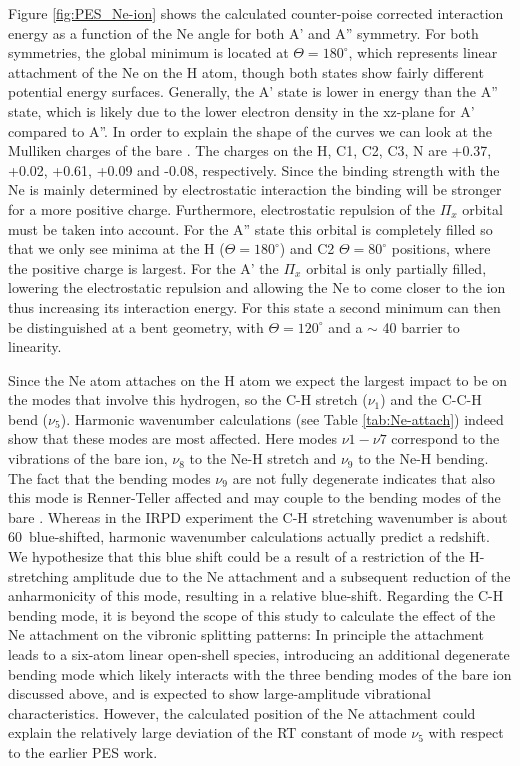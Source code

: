 Figure \ref{fig:PES_Ne-ion} shows the calculated counter-poise corrected interaction energy
as a function of the Ne angle for both A’ and A” symmetry. For both symmetries, the global
minimum is located at $\Theta=180^{\circ}$, which represents linear attachment of the Ne on the H atom,
though both states show fairly different potential energy surfaces. Generally, the A’ state is lower
in energy than the A” state, which is likely due to the lower electron density in the xz-plane for A’
compared to A”. In order to explain the shape of the curves we can look at the Mulliken charges
of the bare \ion. The charges on the H, C1, C2, C3, N are +0.37, +0.02, +0.61, +0.09 and
-0.08, respectively. Since the binding strength with the Ne is mainly determined by electrostatic
interaction the binding will be stronger for a more positive charge. Furthermore, electrostatic
repulsion of the $\Pi_x$ orbital must be taken into account. For the A” state this orbital is completely
filled so that we only see minima at the H ($\Theta=180^{\circ}$) and C2 $\Theta=80^{\circ}$ positions, where the
positive charge is largest. For the A’ the $\Pi_x$ orbital is only partially filled, lowering the electrostatic
repulsion and allowing the Ne to come closer to the ion thus increasing its interaction energy. For
this state a second minimum can then be distinguished at a bent geometry, with $\Theta=120^{\circ}$ and a
$\sim$ 40 \wns barrier to linearity.

Since the Ne atom attaches on the H atom we expect the largest impact to be on the modes that involve this hydrogen, so the C-H stretch ($\nu_1$) and the C-C-H bend ($\nu_5$). Harmonic wavenumber calculations (see Table \ref{tab:Ne-attach}) indeed show that these modes are most affected.
Here modes $\nu1-\nu7$ correspond to the vibrations of the bare ion, $\nu_8$ to the Ne-H stretch
and $\nu_9$ to the Ne-H bending. The fact that the bending modes $\nu_9$ are not fully degenerate indicates
that also this mode is Renner-Teller affected and may couple to the bending modes of the bare
\ion. Whereas in the IRPD experiment the C-H stretching wavenumber is about 60~\wns blue-shifted, harmonic wavenumber calculations actually predict a redshift. We hypothesize that this blue shift could be a result of a restriction of the H-stretching amplitude due to the Ne attachment and a subsequent reduction of the anharmonicity of this mode, resulting in a relative blue-shift. Regarding the C-H bending mode, it is beyond the scope of this study to calculate the effect of the Ne attachment on the vibronic splitting patterns: In principle the attachment leads to a six-atom linear open-shell species, introducing an additional degenerate bending mode which likely interacts with the three bending modes of the bare ion discussed above, and is expected to show large-amplitude vibrational characteristics. However, the calculated position of the Ne attachment could explain the relatively large deviation of the RT constant of mode $\nu_5$ with respect to the earlier PES work.


